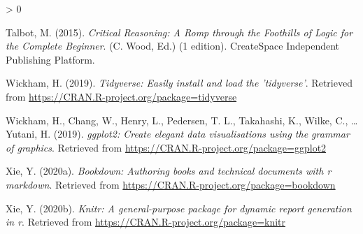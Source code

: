\documentclass[
  a4paper,11pt,twoside,onecolumn,openright,final,oldfontcommands]{memoir}
\newlength{\cslhangindent}
\newenvironment{CSLReferences}[2] %
 {%
  \setlength{\parindent}{0pt}
  \ifodd #1 \everypar{\setlength{\hangindent}{\cslhangindent}}\ignorespaces\fi
  \ifnum #2 > 0
  \setlength{\parskip}{#2\baselineskip}
  \fi
 }%
 {}
\theoremstyle{definition}
\theoremstyle{definition}
\theoremstyle{definition}
\theoremstyle{remark}
\begin{document}
\begin{CSLReferences}{1}{0}
\leavevmode\hypertarget{ref-talbot_critical_2015}{}%
Talbot, M. (2015). \emph{Critical {Reasoning}: {A} {Romp} through the {Foothills} of {Logic} for the {Complete} {Beginner}}. (C. Wood, Ed.) (1 edition). CreateSpace Independent Publishing Platform.

\leavevmode\hypertarget{ref-R-tidyverse}{}%
Wickham, H. (2019). \emph{Tidyverse: Easily install and load the 'tidyverse'}. Retrieved from \url{https://CRAN.R-project.org/package=tidyverse}

\leavevmode\hypertarget{ref-R-ggplot2}{}%
Wickham, H., Chang, W., Henry, L., Pedersen, T. L., Takahashi, K., Wilke, C., \ldots{} Yutani, H. (2019). \emph{ggplot2: Create elegant data visualisations using the grammar of graphics}. Retrieved from \url{https://CRAN.R-project.org/package=ggplot2}

\leavevmode\hypertarget{ref-R-bookdown}{}%
Xie, Y. (2020a). \emph{Bookdown: Authoring books and technical documents with r markdown}. Retrieved from \url{https://CRAN.R-project.org/package=bookdown}

\leavevmode\hypertarget{ref-R-knitr}{}%
Xie, Y. (2020b). \emph{Knitr: A general-purpose package for dynamic report generation in r}. Retrieved from \url{https://CRAN.R-project.org/package=knitr}

\end{CSLReferences}
\end{document}
